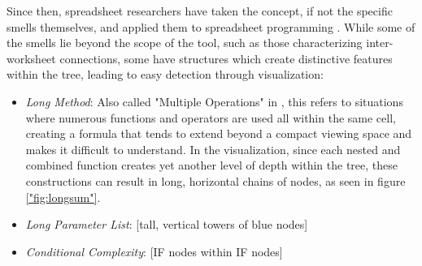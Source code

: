 \documentclass[conference]{IEEEtran}
\begin{document}
	Since then, spreadsheet researchers have taken the concept, if not the specific
	smells themselves, and applied them to spreadsheet programming
	\cite{hermans2012detecting} \cite{cunha2012towards} \cite{jansen2015code}
	\cite{asavametha2012detecting} . While some of the smells lie beyond the scope
	of the tool, such as those characterizing inter-worksheet connections, some
	have structures which create distinctive features within the tree, leading to
	easy detection through visualization: \par
	
	\begin{itemize} \item \textit{Long Method}: Also called "Multiple Operations"
		in \cite{hermans2012detecting}, this refers to situations where numerous
		functions and operators are used all within the same cell, creating a formula
		that tends to extend beyond a compact viewing space and makes it difficult to
		understand. In the visualization, since each nested and combined function
		creates yet another level of depth within the tree, these constructions can
		result in long, horizontal chains of nodes, as seen in figure
		\ref{"fig:longsum"}. \item \textit{Long Parameter List}: [tall, vertical towers
		of blue nodes] \item \textit{Conditional Complexity}: [IF nodes within IF
		nodes] \end{itemize}
	
\end{document}
